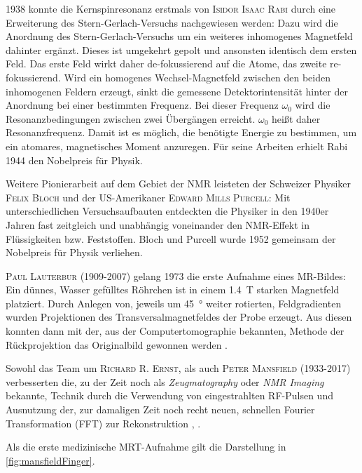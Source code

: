 1938 konnte die Kernspinresonanz erstmals von \textsc{Isidor Isaac Rabi} durch eine Erweiterung des Stern-Gerlach-Versuchs nachgewiesen werden: Dazu wird die Anordnung des Stern-Gerlach-Versuchs um ein weiteres inhomogenes Magnetfeld dahinter ergänzt. Dieses ist umgekehrt gepolt und ansonsten identisch dem ersten Feld. Das erste Feld wirkt daher de-fokussierend auf die Atome, das zweite re-fokussierend. Wird ein homogenes Wechsel-Magnetfeld zwischen den beiden inhomogenen Feldern erzeugt, sinkt die gemessene Detektorintensität hinter der Anordnung bei einer bestimmten Frequenz. Bei dieser Frequenz $\omega_0$ wird die Resonanzbedingungen zwischen zwei Übergängen erreicht. $\omega_0$ heißt daher Resonanzfrequenz. Damit ist es möglich, die benötigte Energie zu bestimmen, um ein atomares, magnetisches Moment anzuregen. Für seine Arbeiten erhielt Rabi 1944 den Nobelpreis für Physik. \cite{Rabi1938}

Weitere Pionierarbeit auf dem Gebiet der NMR leisteten der Schweizer Physiker \textsc{Felix Bloch} und der US-Amerikaner \textsc{Edward Mills Purcell}: Mit unterschiedlichen Versuchsaufbauten entdeckten die Physiker in den 1940er Jahren fast zeitgleich und unabhängig voneinander den NMR-Effekt in Flüssigkeiten bzw. Feststoffen. Bloch und Purcell wurde 1952 gemeinsam der Nobelpreis für Physik verliehen.

\textsc{Paul Lauterbur} (1909-2007) gelang 1973 die erste Aufnahme eines MR-Bildes: Ein dünnes, Wasser gefülltes Röhrchen ist in einem \SI{1.4}{\tesla} starken Magnetfeld platziert. Durch Anlegen von, jeweils um \SI{45}{\degree} weiter rotierten, Feldgradienten wurden Projektionen des Transversalmagnetfeldes der Probe erzeugt. Aus diesen konnten dann mit der, aus der Computertomographie bekannten, Methode der Rückprojektion das Originalbild gewonnen werden \cite{LAUTERBUR1973}.

Sowohl das Team um \textsc{Richard R. Ernst}, als auch \textsc{Peter Mansfield} (1933-2017) verbesserten die, zu der Zeit noch als \textit{Zeugmatography} oder \textit{NMR Imaging} bekannte, Technik durch die Verwendung von eingestrahlten RF-Pulsen und Ausnutzung der, zur damaligen Zeit noch recht neuen, schnellen Fourier Transformation (FFT) zur Rekonstruktion \cite{Kumar1975}, \cite{Mansfield1977}.

Als die erste medizinische MRT-Aufnahme gilt die Darstellung in \autoref{fig:mansfieldFinger}.

